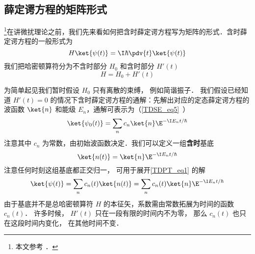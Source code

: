 

\subsection{薛定谔方程的矩阵形式}
\footnote{本文参考 \cite{GriffQ}．}在讲微扰理论之前，我们先来看如何把含时薛定谔方程写为矩阵的形式．含时薛定谔方程的一般形式为
\begin{equation}\label{TDPT_eq1}
H \ket{\psi(t)} = \I\hbar \pdv{t} \ket{\psi(t)}
\end{equation}
我们把哈密顿算符分为不含时部分 $H_0$ 和含时部分 $H'(t)$
\begin{equation}
H = H_0 + H'(t)
\end{equation}

为简单起见我们暂时假设 $H_0$ 只有离散的束缚， 例如简谐振子． 我们假设已经知道 $H'(t) = 0$ 的情况下含时薛定谔方程的通解：先解出对应的定态薛定谔方程的波函数 $\ket{n}$ 和能级 $E_n$，通解可表示为（\autoref{TDSE_eq5}~）
\begin{equation}
\ket{\psi_0(t)} = \sum_n c_n \ket{n} \E^{-\I E_n t/\hbar}
\end{equation}
注意其中 $c_n$ 为常数，由初始波函数决定．我们可以定义一组\textbf{含时}基底
\begin{equation}
\ket{n(t)} = \ket{n} \E^{-\I E_n t/\hbar}
\end{equation}
注意任何时刻这组基底都正交归一， 可用于展开\autoref{TDPT_eq1} 的解
\begin{equation}
\ket{\psi(t)} = \sum_n c_n(t) \ket{n(t)} = \sum_n c_n(t) \ket{n} \E^{-\I E_n t/\hbar}
\end{equation}
由于基底并不是总哈密顿算符 $H$ 的本征矢，系数需由常数拓展为时间的函数 $c_n(t)$． 许多时候， $H'(t)$ 只在一段有限的时间内不为零， 那么 $c_n(t)$ 也只在这段时间内变化， 在其他时间不变．


